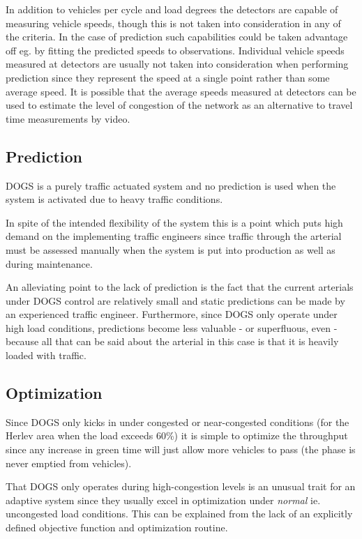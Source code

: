 In addition to vehicles per cycle and load degrees the detectors are capable of measuring vehicle speeds, though this is not taken into consideration in any of the criteria. In the case of prediction such capabilities could be taken advantage off eg. by fitting the predicted speeds to observations.
Individual vehicle speeds measured at detectors are usually not taken into consideration when performing prediction since they represent the speed at a single point rather than some average speed. It is possible that the average speeds measured at detectors can be used to estimate the level of congestion of the network as an alternative to travel time measurements by video.

\subsection{Prediction}
DOGS is a purely traffic actuated system and no prediction is used when the system is activated due to heavy traffic conditions.

In spite of the intended flexibility of the system this is a point which puts high demand on the implementing traffic engineers since traffic through the arterial must be assessed manually when the system is put into production as well as during maintenance.

An alleviating point to the lack of prediction is the fact that the current arterials under DOGS control are relatively small and static predictions can be made by an experienced traffic engineer. Furthermore, since DOGS only operate under high load conditions, predictions become less valuable - or superfluous, even - because all that can be said about the arterial in this case is that it is heavily loaded with traffic.

\subsection{Optimization}
Since DOGS only kicks in under congested or near-congested conditions (for the Herlev area when the load exceeds 60\%) it is simple to optimize the throughput since any increase in green time will just allow more vehicles to pass (the phase is never emptied from vehicles).

That DOGS only operates during high-congestion levels is an unusual trait for an adaptive system since they usually excel in optimization under \textit{normal} ie. uncongested load conditions. This can be explained from the lack of an explicitly defined objective function and optimization routine.

